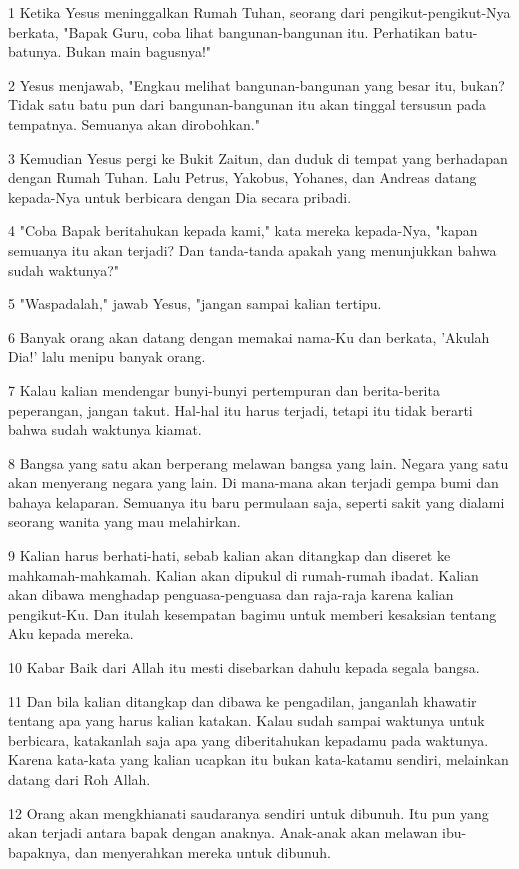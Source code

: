 \par 1 Ketika Yesus meninggalkan Rumah Tuhan, seorang dari pengikut-pengikut-Nya berkata, "Bapak Guru, coba lihat bangunan-bangunan itu. Perhatikan batu-batunya. Bukan main bagusnya!"
\par 2 Yesus menjawab, "Engkau melihat bangunan-bangunan yang besar itu, bukan? Tidak satu batu pun dari bangunan-bangunan itu akan tinggal tersusun pada tempatnya. Semuanya akan dirobohkan."
\par 3 Kemudian Yesus pergi ke Bukit Zaitun, dan duduk di tempat yang berhadapan dengan Rumah Tuhan. Lalu Petrus, Yakobus, Yohanes, dan Andreas datang kepada-Nya untuk berbicara dengan Dia secara pribadi.
\par 4 "Coba Bapak beritahukan kepada kami," kata mereka kepada-Nya, "kapan semuanya itu akan terjadi? Dan tanda-tanda apakah yang menunjukkan bahwa sudah waktunya?"
\par 5 "Waspadalah," jawab Yesus, "jangan sampai kalian tertipu.
\par 6 Banyak orang akan datang dengan memakai nama-Ku dan berkata, 'Akulah Dia!' lalu menipu banyak orang.
\par 7 Kalau kalian mendengar bunyi-bunyi pertempuran dan berita-berita peperangan, jangan takut. Hal-hal itu harus terjadi, tetapi itu tidak berarti bahwa sudah waktunya kiamat.
\par 8 Bangsa yang satu akan berperang melawan bangsa yang lain. Negara yang satu akan menyerang negara yang lain. Di mana-mana akan terjadi gempa bumi dan bahaya kelaparan. Semuanya itu baru permulaan saja, seperti sakit yang dialami seorang wanita yang mau melahirkan.
\par 9 Kalian harus berhati-hati, sebab kalian akan ditangkap dan diseret ke mahkamah-mahkamah. Kalian akan dipukul di rumah-rumah ibadat. Kalian akan dibawa menghadap penguasa-penguasa dan raja-raja karena kalian pengikut-Ku. Dan itulah kesempatan bagimu untuk memberi kesaksian tentang Aku kepada mereka.
\par 10 Kabar Baik dari Allah itu mesti disebarkan dahulu kepada segala bangsa.
\par 11 Dan bila kalian ditangkap dan dibawa ke pengadilan, janganlah khawatir tentang apa yang harus kalian katakan. Kalau sudah sampai waktunya untuk berbicara, katakanlah saja apa yang diberitahukan kepadamu pada waktunya. Karena kata-kata yang kalian ucapkan itu bukan kata-katamu sendiri, melainkan datang dari Roh Allah.
\par 12 Orang akan mengkhianati saudaranya sendiri untuk dibunuh. Itu pun yang akan terjadi antara bapak dengan anaknya. Anak-anak akan melawan ibu-bapaknya, dan menyerahkan mereka untuk dibunuh.
